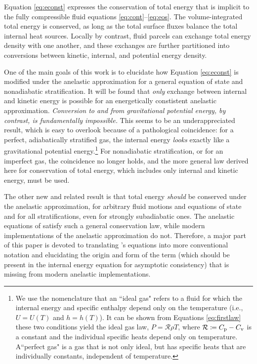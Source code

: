\documentclass[12pt]{article}
\begin{document}
	Equation \eqref{eq:econst} expresses the conservation of total energy that is implicit to the fully compressible fluid equations \eqref{eq:cont}--\eqref{eq:eos}. The volume-integrated total energy is conserved, as long as the total surface fluxes balance the total internal heat sources. Locally by contrast, fluid parcels can exchange total energy density with one another, and these exchanges are further partitioned into conversions between kinetic, internal, and potential energy density.
	
	One of the main goals of this work is to elucidate how Equation \eqref{eq:econst} is modified under the anelastic approximation for a general equation of state and nonadiabatic stratification. It will be found that \textit{only} exchange between internal and kinetic energy is possible for an energetically constistent anelastic approximation. \textit{Conversion to and from gravitational potential energy, by contrast, is fundamentally impossible.} This seems to be an underappreciated result, which is easy to overlook because of a pathological coincidence: for a perfect, adiabatically stratified gas, the internal energy \textit{looks} exactly like a gravitational potential energy.\footnote{We use the nomenclature that an ``ideal gas" refers to a fluid for which the internal energy and specific enthalpy depend only on the temperature (i.e., $U=U(T)$ and $h=h(T)$). It can be shown from Equations \eqref{eq:firstlaw} these two conditions yield the ideal gas law, $P=\mathcal{R}\rho T$, where $\mathcal{R}\coloneqq C_{\rm{p}}-C_{\rm{v}}$ is a constant and the individual specific heats depend only on temperature. A``perfect gas" is a gas that is not only ideal, but has specific heats that are individually constants, independent of temperature.} For nonadiabatic stratification, or for an imperfect gas, the coincidence no longer holds, and the more general law derived here for conservation of total energy, which includes only internal and kinetic energy, must be used. 
	
The other new and related result is that total energy \textit{should} be conserved under the anelastic approximation, for arbitrary fluid motions and equations of state and for all stratifications, even for strongly subadiabatic ones. The anelastic equations of \citet{Gough1969} satisfy such a general conservation law, while modern implementations of the anelastic approximation do not. Therefore, a major part of this paper is devoted to translating \citet{Gough1969}'s equations into more conventional notation and elucidating the origin and form of the term (which should be present in the internal energy equation for asymptotic consistency) that is missing from modern anelastic implementations. 
\end{document}

